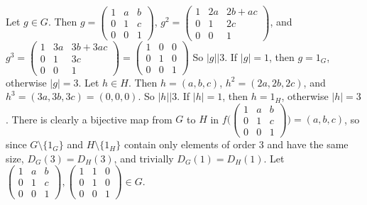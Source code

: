\documentclass[11pt]{article}
\begin{document}
\subsection{} %
Let $g\in G$. Then $g=\begin{pmatrix}
	1 & a & b\\
	0 & 1 & c\\
	0 & 0 & 1
\end{pmatrix}$, $g^2=\begin{pmatrix}
	1 & 2a & 2b+ac\\
	0 & 1 & 2c\\
	0 & 0 & 1
\end{pmatrix}$, and $g^3=\begin{pmatrix}
	1 & 3a & 3b+3ac\\
	0 & 1 & 3c\\
	0 & 0 & 1
\end{pmatrix}=\begin{pmatrix}
	1 & 0 & 0\\
	0 & 1 & 0\\
	0 & 0 & 1
\end{pmatrix}$
So $|g|\big\vert3$. If $|g|=1$, then $g=1_G$, otherwise $|g|=3$.
\newline
\newline
Let $h\in H$. Then $h=(a,b,c)$, $h^2=(2a,2b,2c)$, and $h^3=(3a,3b,3c)=(0,0,0)$.
So $|h|\big\vert3$. If $|h|=1$, then $h=1_H$, otherwise $|h|=3$.
\newline
\newline
There is clearly a bijective map from $G$ to $H$ in $f\Biggl(\begin{pmatrix}
	1 & a & b\\
	0 & 1 & c\\
	0 & 0 & 1
\end{pmatrix}\Biggr)=(a,b,c)$, so since $G\setminus\{1_G\}$ and $H\setminus\{1_H\}$
contain only elements of order 3 and have the same size, $D_G(3)=D_H(3)$, and
trivially $D_G(1)=D_H(1)$.
\newline
\newline
Let $\begin{pmatrix}
	1 & a & b\\
	0 & 1 & c\\
	0 & 0 & 1
\end{pmatrix},\begin{pmatrix}
	1 & 1 & 0\\
	0 & 1 & 0\\
	0 & 0 & 1
\end{pmatrix}\in G$.
\end{document}
